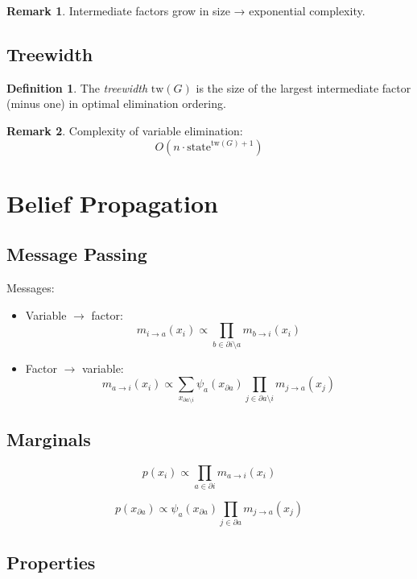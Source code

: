 \documentclass[12pt,oneside]{book}
\numberwithin{equation}{section}
\theoremstyle{definition}
\newtheorem{definition}{Definition}[section]
\newtheorem{remark}{Remark}[section]
\theoremstyle{plain}
\theoremstyle{remark}
\begin{document}
\begin{remark}
Intermediate factors grow in size → exponential complexity.
\end{remark}


\subsection*{Treewidth}

\begin{definition}
The \emph{treewidth} $\mathrm{tw}(G)$ is the size of the largest intermediate factor (minus one) in optimal elimination ordering.
\end{definition}

\begin{remark}
Complexity of variable elimination:
\[
O(n \cdot \text{state}^{\mathrm{tw}(G)+1})
\]
\end{remark}


\section{Belief Propagation}

\subsection{Message Passing}

Messages:

\begin{itemize}
\item Variable $\to$ factor:
\[
m_{i \to a}(x_i)
\propto \prod_{b \in \partial i \setminus a} m_{b \to i}(x_i)
\]

\item Factor $\to$ variable:
\[
m_{a \to i}(x_i)
\propto
\sum_{x_{\partial a \setminus i}}
\psi_a(x_{\partial a})
\prod_{j \in \partial a \setminus i} m_{j \to a}(x_j)
\]
\end{itemize}


\subsection*{Marginals}

\[
p(x_i)
\propto \prod_{a \in \partial i} m_{a \to i}(x_i)
\]

\[
p(x_{\partial a})
\propto
\psi_a(x_{\partial a})
\prod_{j \in \partial a} m_{j \to a}(x_j)
\]


\subsection{Properties}
\end{document}
